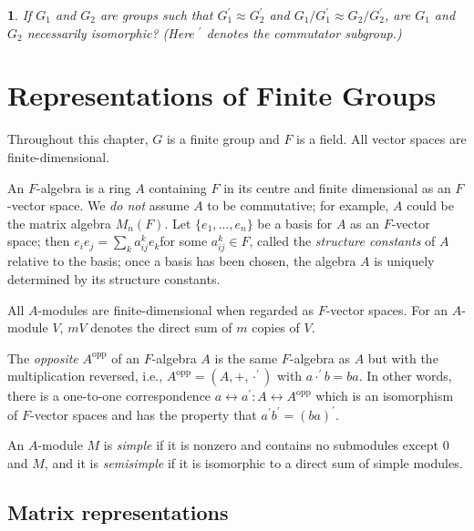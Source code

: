\documentclass[a4paper,11pt,final]{memoir}%
\newtheorem{exercise}[Y]{}
\theoremstyle{nonumberplain}
\begin{document}
\begin{exercise}
\label{x34}If $G_{1}$ and $G_{2}$ are groups such that $G_{1}^{\prime}\approx
G_{2}^{\prime}$ and $G_{1}/G_{1}^{\prime}\approx G_{2}/G_{2}^{\prime}$, are
$G_{1}$ and $G_{2}$ necessarily isomorphic? (Here $^{\prime}$ denotes the
commutator subgroup.)
\end{exercise}

\clearpage


\chapter{Representations of Finite Groups}

Throughout this chapter, $G$ is a finite group and $F$ is a field. All vector
spaces are finite-dimensional.

An $F$-algebra is a ring $A$ containing $F$ in its centre and finite
dimensional as an $F$-vector space. We \textit{do not} assume $A$ to be
commutative; for example, $A$ could be the matrix algebra $M_{n}(F)$. Let
$\{e_{1},\ldots,e_{n}\}$ be a basis for $A$ as an $F$-vector space; then
$e_{i}e_{j}=\sum\nolimits_{k}a_{ij}^{k}e_{k}$for some $a_{ij}^{k}\in F$,
called the \textit{structure constants} of $A$ relative to the basis; once a
basis has been chosen, the algebra $A$ is uniquely determined by its structure constants.

All $A$-modules are finite-dimensional when regarded as $F$-vector spaces. For
an $A$-module $V$, $mV$ denotes the direct sum of $m$ copies of $V$.

The \emph{opposite}%
$A^{\mathrm{opp}}$ of an $F$-algebra $A$ is the same $F$-algebra as $A$ but
with the multiplication reversed, i.e., $A^{\mathrm{opp}}=(A,+,\cdot^{\prime
})$ with $a\cdot^{\prime}b=ba$. In other words, there is a one-to-one
correspondence $a\leftrightarrow a^{\prime}\colon A\leftrightarrow
A^{\mathrm{opp}}$ which is an isomorphism of $F$-vector spaces and has the
property that $a^{\prime}b^{\prime}=(ba)^{\prime}$.

An $A$-module $M$ is \emph{simple}
%
if it is nonzero and contains no submodules except $0$ and $M$, and it is
\emph{semisimple}
%
if it is isomorphic to a direct sum of simple modules.

\section{Matrix representations}
\end{document}
